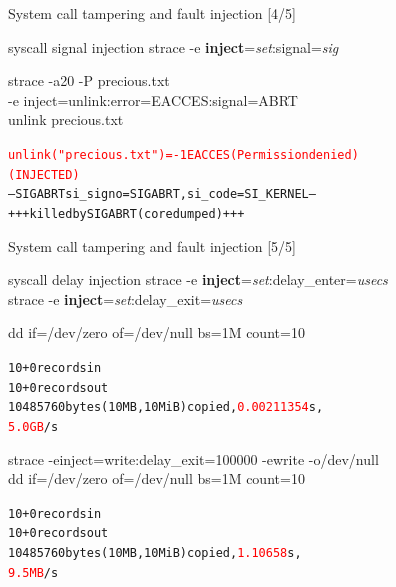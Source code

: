 \documentclass[unicode]{beamer}
\begin{document}
\begin{frame}[fragile]{System call tampering and fault injection \hfill [4/5]}
\begin{block}{\large syscall signal injection}
strace -e \textbf{inject}=\textit{set}:signal=\textit{sig}
\end{block}

\begin{block}{\large strace -a20 -P precious.txt \\ -e inject=unlink:error=EACCES:signal=ABRT \\ unlink precious.txt}
\begin{alltt}
\textcolor{red}{unlink("precious.txt") = -1 EACCES (Permission denied)
 (INJECTED)}
--- SIGABRT {si_signo=SIGABRT, si_code=SI_KERNEL} ---
+++ killed by SIGABRT (core dumped) +++
\end{alltt}
\end{block}
\end{frame}

\begin{frame}[fragile]{System call tampering and fault injection \hfill [5/5]}
\begin{block}{\large syscall delay injection}
strace -e \textbf{inject}=\textit{set}:delay\_enter=\textit{usecs} \\
strace -e \textbf{inject}=\textit{set}:delay\_exit=\textit{usecs}
\end{block}

\begin{block}{dd if=/dev/zero of=/dev/null bs=1M count=10}
\begin{alltt}
10+0 records in
10+0 records out
10485760 bytes (10 MB, 10 MiB) copied, \textcolor{red}{0.00211354} s,
\textcolor{red}{5.0 GB}/s
\end{alltt}
\end{block}

\begin{block}{strace -einject=write:delay\_exit=100000 -ewrite -o/dev/null \\ dd if=/dev/zero of=/dev/null bs=1M count=10}
\begin{alltt}
10+0 records in
10+0 records out
10485760 bytes (10 MB, 10 MiB) copied, \textcolor{red}{1.10658} s,
\textcolor{red}{9.5 MB}/s
\end{alltt}
\end{block}
\end{frame}
\end{document}

